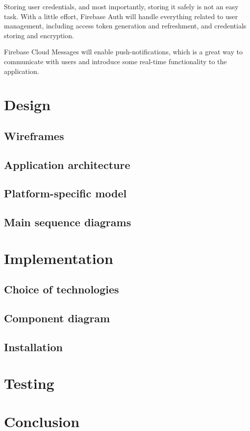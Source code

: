 \documentclass[thesis=B,english]{FITthesis}[2012/10/20]
\begin{document}
Storing user credentials, and most importantly, storing it safely is not an easy task. With a little effort, Firebase Auth will handle everything related to user management, including access token generation and refreshment, and credentials storing and encryption.

Firebase Cloud Messages will enable push-notifications, which is a great way to communicate with users and introduce some real-time functionality to the application. 

	
\newpage

\chapter{Design}
\section{Wireframes}
\section{Application architecture}
\section{Platform-specific model}
\section{Main sequence diagrams}

\chapter{Implementation}
\section{Choice of technologies}
\section{Component diagram}
\section{Installation}


\chapter{Testing}


\chapter{Conclusion}
\end{document}
